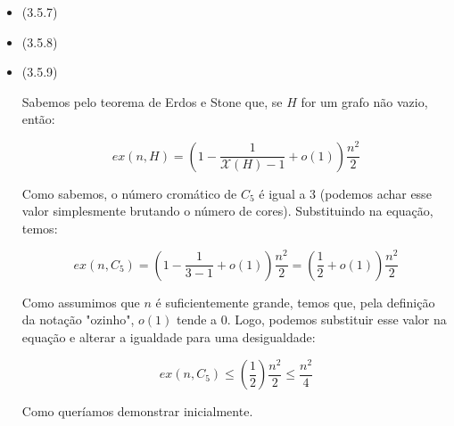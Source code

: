 \documentclass{article}
\begin{document}
\begin{enumerate}
\begin{itemize}
		      \item (3.5.7)
		      \item (3.5.8)
		      \item (3.5.9)

		            Sabemos pelo teorema de Erdos e Stone que, se \(H\) for um grafo não vazio, então:

		            \[ex(n, H) = (1 - \frac{1}{\mathcal{X}(H) - 1} + o(1))\frac{n^2}{2}\]

		            Como sabemos, o número cromático de \(C_5\) é igual a 3 (podemos achar esse valor simplesmente brutando o número de cores). Substituindo na equação, temos:

		            \[ex(n, C_5) = (1 - \frac{1}{3 - 1} + o(1))\frac{n^2}{2} = (\frac{1}{2} + o(1))\frac{n^2}{2}\]

		            Como assumimos que \(n\) é suficientemente grande, temos que, pela definição da notação "ozinho", \(o(1)\) tende a 0. Logo, podemos substituir esse valor na equação e alterar a igualdade para uma desigualdade:

		            \[ex(n, C_5) \leq (\frac{1}{2})\frac{n^2}{2} \leq \frac{n^2}{4}\]

		            Como queríamos demonstrar inicialmente.

	      \end{itemize}
\end{enumerate}
\end{document}
